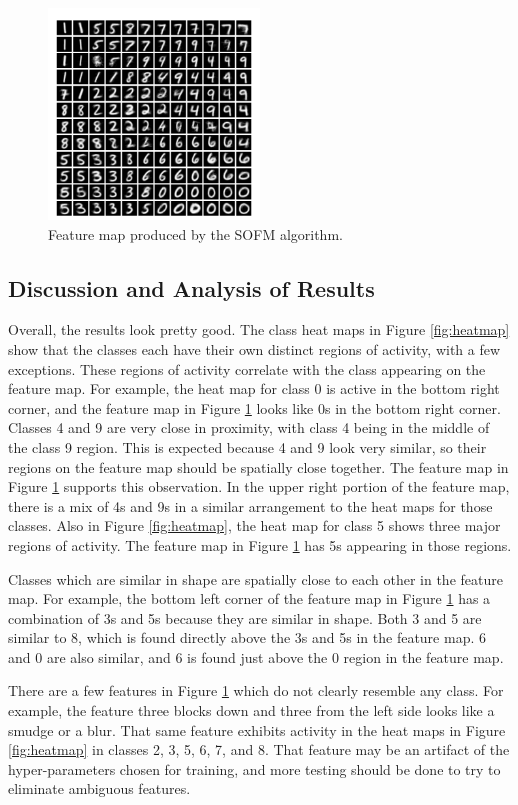 \documentclass[a4paper, 12pt, titlepage]{article}
\newcommand{\figRef}[1]{Figure \ref{#1}}
\begin{document}
  \begin{figure}[p]
    \centering
    \includegraphics[width=0.5\textwidth]{images/features.png}
    \caption{Feature map produced by the SOFM algorithm.}
    \label{fig:feat}
  \end{figure}

  \subsection{Discussion and Analysis of Results}
  \par Overall, the results look pretty good.
  The class heat maps in \figRef{fig:heatmap} show that the classes each have
  their own distinct regions of activity, with a few exceptions.
  These regions of activity correlate with the class appearing on the feature
  map.
  For example, the heat map for class 0 is active in the bottom right corner,
  and the feature map in \figRef{fig:feat} looks like 0s in the bottom right
  corner.
  Classes 4 and 9 are very close in proximity, with class 4 being in the
  middle of the class 9 region.
  This is expected because 4 and 9 look very similar, so their regions on the
  feature map should be spatially close together.
  The feature map in \figRef{fig:feat} supports this observation.
  In the upper right portion of the feature map, there is a mix of 4s and 9s in
  a similar arrangement to the heat maps for those classes.
  Also in \figRef{fig:heatmap}, the heat map for class 5 shows three major
  regions of activity.
  The feature map in \figRef{fig:feat} has 5s appearing in those regions.
  \par Classes which are similar in shape are spatially close to each other in
  the feature map.
  For example, the bottom left corner of the feature map in \figRef{fig:feat}
  has a combination of 3s and 5s because they are similar in shape.
  Both 3 and 5 are similar to 8, which is found directly above the 3s and 5s in
  the feature map.
  6 and 0 are also similar, and 6 is found just above the 0 region in the
  feature map.
  \par There are a few features in \figRef{fig:feat} which do not clearly
  resemble any class.
  For example, the feature three blocks down and three from the left side looks
  like a smudge or a blur.
  That same feature exhibits activity in the heat maps in \figRef{fig:heatmap}
  in classes 2, 3, 5, 6, 7, and 8.
  That feature may be an artifact of the hyper-parameters chosen for training,
  and more testing should be done to try to eliminate ambiguous features.
\end{document}
